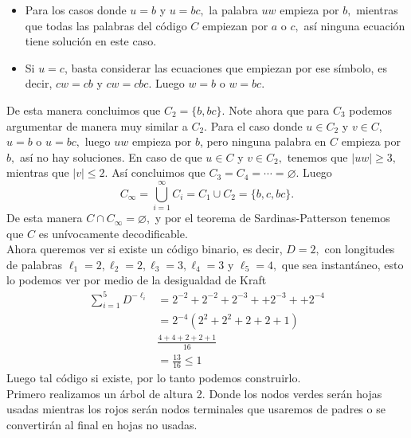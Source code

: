 \begin{sols}
    \begin{itemize}
        \item Para los casos donde $u=b$ y $u=bc,$ la palabra $uw$ empieza por $b,$ mientras que todas las palabras del código $C$ empiezan por $a$ o $c,$ así ninguna ecuación tiene solución en este caso.
        \item Si $u=c$, basta considerar las ecuaciones que empiezan por ese símbolo, es decir, $cw=cb$ y $cw=cbc.$ Luego $w=b$ o $w=bc.$
    \end{itemize}
    De esta manera concluimos que $C_2=\{b,bc\}.$ Note ahora que para $C_3$ podemos argumentar de manera muy similar a $C_2.$ Para el caso donde $u\in C_2$ y $v\in C$, $u=b$ o $u=bc,$ luego $uw$ empieza por $b$, pero ninguna palabra en $C$ empieza por $b,$ así no hay soluciones. En caso de que $u\in C$ y $v\in C_2,$ tenemos que $|uw|\geq 3,$ mientras que $|v|\leq 2.$ Así concluimos que $C_3=C_4=\cdots=\varnothing.$ Luego
    $$C_\infty=\bigcup_{i=1}^\infty C_i=C_1\cup C_2=\{b,c,bc\}.$$
    De esta manera $C\cap C_\infty=\varnothing,$ y por el teorema de Sardinas-Patterson tenemos que $C$ es unívocamente decodificable.\\

    Ahora queremos ver si existe un código binario, es decir, $D=2,$ con longitudes de palabras $\ell_1=2,\ell_2=2,\ell_3=3,\ell_4=3$ y $\ell_5=4,$ que sea instantáneo, esto lo podemos ver por medio de la desigualdad de Kraft
    \begin{align*}
        \sum_{i=1}^5D^{-\ell_i}&=2^{-2}+2^{-2}+2^{-3}++2^{-3}++2^{-4}\\
        &=2^{-4}(2^2+2^2+2+2+1)\\
        &\frac{4+4+2+2+1}{16}\\
        &=\frac{13}{16}\leq 1
    \end{align*}
    Luego tal código si existe, por lo tanto podemos construirlo.\\

    Primero realizamos un árbol de altura 2. Donde los nodos verdes serán hojas usadas mientras los rojos serán nodos terminales que usaremos de padres o se convertirán al final en hojas no usadas.
\begin{center}
       \begin{tikzpicture}[level 1/.style={sibling distance=25mm}, level 2/.style={sibling distance=15mm}]


\end{tikzpicture}
\end{center}
\end{sols}
